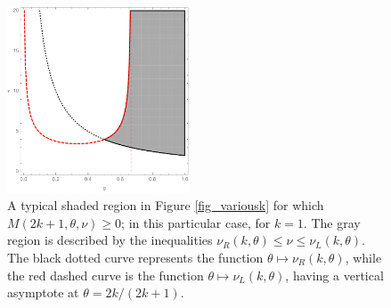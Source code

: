 \documentclass[a4paper]{article}
\newcommand{\te}{\theta}
\newcommand{\nul}{\nu_L(k,\theta)}
\newcommand{\nur}{\nu_R(k,\theta)}
\begin{document}
\begin{figure}
\begin{center}
\includegraphics[width=0.48\textwidth]{fig_boundary.pdf}
\caption{A typical shaded region in Figure \ref{fig_variousk} for which $M(2k+1,\te,\nu)\ge 0$; in this particular case, for $k=1$. The gray region is described by the inequalities $\nur\le\nu\le\nul$. The black dotted curve represents the function $\te\mapsto\nur$, while the red dashed curve is the function 
$\te\mapsto\nul$, having a vertical asymptote at $\te=2k/(2k+1)$.}\label{fig_boundary}
\end{center}
\end{figure}
\end{document}
